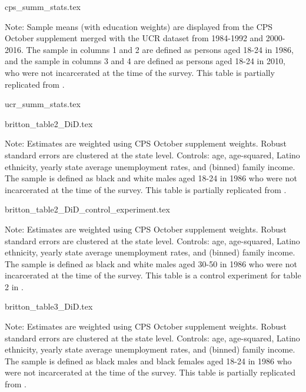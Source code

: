 
{cps_summ_stats.tex}

\begin{footnotesize}
  \noindent Note: Sample means (with education weights) are displayed from the CPS October supplement merged with the UCR dataset from 1984-1992 and 2000-2016. The sample in columns 1 and 2 are defined as persons aged 18-24 in 1986, and the sample in columns 3 and 4 are defined as persons aged 18-24 in 2010, who were not incarcerated at the time of the survey. This table is partially replicated from \cite{britton2022}.
\end{footnotesize}

{ucr_summ_stats.tex}

{britton_table2_DiD.tex}
\begin{footnotesize}
  \noindent Note: Estimates are weighted using CPS October supplement weights. Robust standard errors are clustered at the state level. Controls: age, age-squared, Latino ethnicity, yearly state average unemployment rates, and (binned) family income. The sample is defined as black and white males aged 18-24 in 1986 who were not incarcerated at the time of the survey.
  This table is partially replicated from \cite{britton2022}.
\end{footnotesize}

{britton_table2_DiD_control_experiment.tex}
\begin{footnotesize}
  \noindent Note: Estimates are weighted using CPS October supplement weights. Robust standard errors are clustered at the state level. Controls: age, age-squared, Latino ethnicity, yearly state average unemployment rates, and (binned) family income. The sample is defined as black and white males aged 30-50 in 1986 who were not incarcerated at the time of the survey.
  This table is a control experiment for table 2 in \cite{britton2022}.
\end{footnotesize}
\clearpage

{britton_table3_DiD.tex}
\begin{footnotesize}
  \noindent Note: Estimates are weighted using CPS October supplement weights. Robust standard errors are clustered at the state level. Controls: age, age-squared, Latino ethnicity, yearly state average unemployment rates, and (binned) family income. The sample is defined as black males and black females aged 18-24 in 1986 who were not incarcerated at the time of the survey.
  This table is partially replicated from \cite{britton2022}.
\end{footnotesize}


